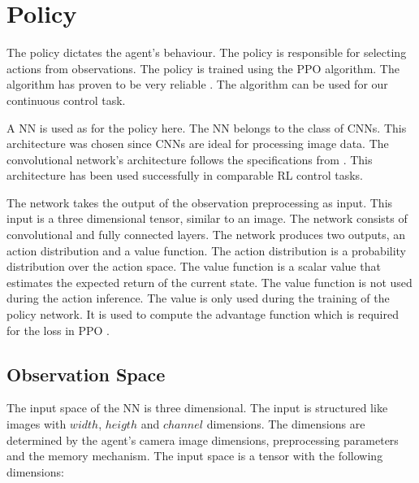 
\section{Policy}
\label{fig:policy_description}

The policy dictates the agent's behaviour. The policy is responsible for selecting actions from observations. The policy is trained using the \ac{PPO} algorithm. The algorithm has proven to be very reliable \textcite{ppo}. The algorithm can be used for our continuous control task.

A \ac{NN} is used as for the policy here. The \ac{NN} belongs to the class of \acp{CNN}. This architecture was chosen since \ac{CNN}s are ideal for processing image data. The convolutional network's architecture follows the specifications from \textcite{human_level_control}. This architecture has been used successfully in comparable \ac{RL} control tasks.

The network takes the output of the observation preprocessing as input. This input is a three dimensional tensor, similar to an image. The network consists of convolutional and fully connected layers. The network produces two outputs, an action distribution and a value function. The action distribution is a probability distribution over the action space.
The value function is a scalar value that estimates the expected return of the current state. The value function is not used during the action inference. The value is only used during the training of the policy network. It is used to compute the advantage function which is required for the loss in \ac{PPO} \textcite{ppo}.






\subsection{Observation Space}

The input space of the \ac{NN} is three dimensional. The input is structured like images with $width$, $heigth$ and $channel$ dimensions. The dimensions are determined by the agent's camera image dimensions, preprocessing parameters and the memory mechanism. The input space is a tensor with the following dimensions:

